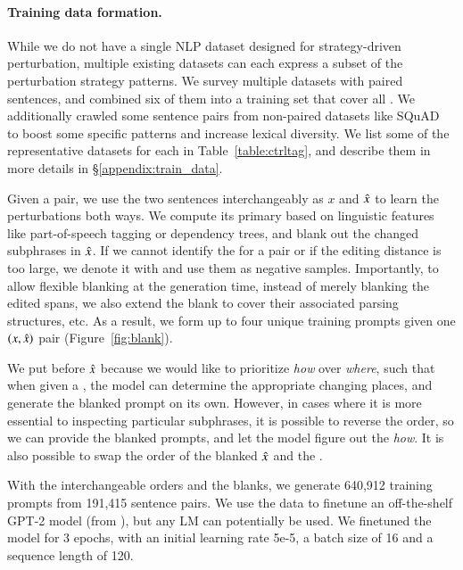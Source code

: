 \paragraph{Training data formation.}

While we do not have a single NLP dataset designed for strategy-driven perturbation, multiple existing datasets can each express a subset of the perturbation strategy patterns.
We survey multiple datasets with paired sentences, and combined six of them into a training set that cover all \tagstrs.
We additionally crawled some sentence pairs from non-paired datasets like SQuAD~\cite{rajpurkar-etal-2016-squad} to boost some specific patterns and increase lexical diversity. 
We list some of the representative datasets for each \tagstr in Table~\ref{table:ctrltag}, and describe them in more details in \S\ref{appendix:train_data}.

Given a pair, we use the two sentences interchangeably as $x$ and $\hat{x}$ to learn the perturbations both ways.
We compute its primary \tagstr based on linguistic features like part-of-speech tagging or dependency trees, and blank out the changed subphrases in $\hat{x}$.
If we cannot identify the \tagstr for a pair or if the editing distance is too large, we denote it with \ctrltag{[global]} and use them as negative samples.
Importantly, to allow flexible blanking at the generation time, instead of merely blanking the edited spans, we also extend the blank to cover their associated parsing structures, etc.
As a result, we form up to four unique training prompts given one $(x, \hat{x})$ pair (Figure~\ref{fig:blank}).

We put \tagstrs before $\hat{x}$ because we would like to prioritize \emph{how} over \emph{where}, such that when given a \tagstr, the model can determine the appropriate changing places, and generate the blanked prompt on its own. 
However, in cases where it is more essential to inspecting particular subphrases, it is possible to reverse the order, so we can provide the blanked prompts, and let the model figure out the \emph{how}.
It is also possible to swap the order of the blanked $\hat{x}$ and the \tagstrs. 

With the interchangeable orders and the blanks, we generate 640,912 training prompts from 191,415 sentence pairs.
We use the data to finetune an off-the-shelf GPT-2 model (from \citet{Wolf2019HuggingFacesTS}), but any LM can potentially be used.
We finetuned the model for 3 epochs, with an initial learning rate 5e-5, a batch size of 16 and a sequence length of 120.

